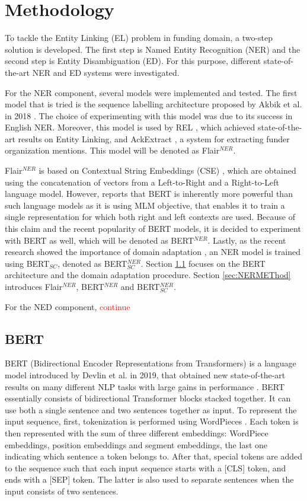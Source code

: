 \documentclass{report}
\theoremstyle{definition}
\theoremstyle{remark}
\begin{document}
\newpage
\chapter{Methodology}
To tackle the Entity Linking (EL) problem in funding domain, a two-step solution is developed. The first step is Named Entity Recognition (NER) and the second step is Entity Disambiguation (ED). For this purpose, different state-of-the-art NER and ED systems were investigated.

For the NER component, several models were implemented and tested. The first model that is tried is the sequence labelling architecture proposed by Akbik et al. in 2018 \cite{flairpaper}. The choice of experimenting with this model was due to its success in English NER. Moreover, this model is used by REL \cite{REL}, which achieved state-of-the-art results on Entity Linking, and AckExtract \cite{AckExtract}, a system for extracting funder organization mentions. This model will be denoted as Flair$^{NER}$.

Flair$^{NER}$ is based on Contextual String Embeddings (CSE) \cite{flairpaper}, which are obtained using the concatenation of vectors from a Left-to-Right and a Right-to-Left language model. However, \cite{BERT} reports that BERT is inherently more powerful than such language models as it is using MLM objective, that enables it to train a single representation for which both right and left contexts are used. Because of this claim and the recent popularity of BERT models, it is decided to experiment with BERT as well, which will be denoted as BERT$^{NER}$. Lastly, as the recent research showed the importance of domain adaptation \textcolor{red}{\cite{}}, an NER model is trained using BERT$_{SC}$, denoted as BERT$_{SC}^{NER}$. Section \ref{sec:BERT} focuses on the BERT architecture and the domain adaptation procedure. Section \ref{sec:NERMEThod} introduces Flair$^{NER}$, BERT$^{NER}$ and BERT$_{SC}^{NER}$.

For the NED component, \textcolor{red}{continue}

\section{BERT}
\label{sec:BERT}

BERT (Bidirectional Encoder Representations from
Transformers) is a language model introduced by Devlin et al. in 2019, that obtained new state-of-the-art results on many different NLP tasks with large gains in performance \cite{BERT}. BERT essentially consists of bidirectional Transformer \cite{transformer} blocks stacked together. It can use both a single sentence and two sentences together as input. To represent the input sequence, first, tokenization is performed using WordPieces \cite{wordpiece}. Each token is then represented with the sum of three different embeddings: WordPiece embeddings, position embeddings and segment embeddings, the last one indicating which sentence a token belongs to. After that, special tokens are added to the sequence such that each input sequence starts with a [CLS] token, and ends with a [SEP] token. The latter is also used to separate sentences when the input consists of two sentences. 
\end{document}
